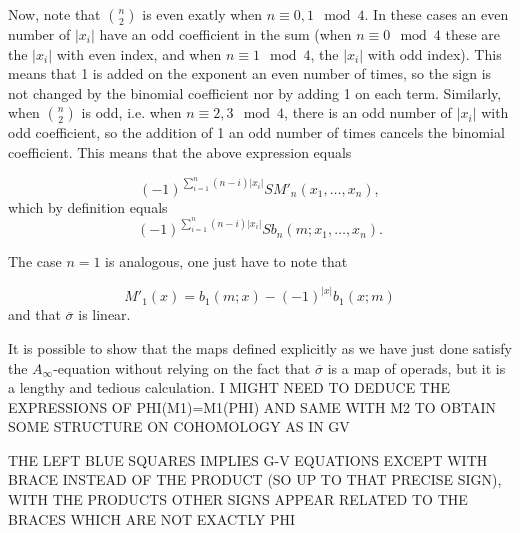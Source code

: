 \documentclass[twoside]{article}
\begin{document}
\begin{appendices}
Now, note that $\binom{n}{2}$ is even exatly when $n\equiv 0,1\mod 4$. In these cases an even number of $|x_i|$ have an odd coefficient in the sum (when $n\equiv 0\mod 4$ these are the $|x_i|$ with even index, and when $n\equiv 1\mod 4$, the $|x_i|$ with odd index). This means that 1 is added on the exponent an even number of times, so the sign is not changed by the binomial coefficient nor by adding 1 on each term. Similarly, when $\binom{n}{2}$ is odd, i.e. when $n\equiv 2,3\mod 4$, there is an odd number of $|x_i|$ with odd coefficient, so the addition of 1 an odd number of times cancels the binomial coefficient. This means that the above expression equals

\[(-1)^{\sum_{i=1}^n(n-i)|x_i|}SM'_n(x_1,\dots,x_n),\]
which by definition equals
\[(-1)^{\sum_{i=1}^n(n-i)|x_i|}Sb_n(m;x_1,\dots,x_n).\]

The case $n=1$ is analogous, one just have to note that 

\[
M'_1(x)=b_1(m;x)-(-1)^{|x|}b_1(x;m)
\]
and that $\overline{\sigma}$ is linear. 

It is possible to show that the maps defined explicitly as we have just done satisfy the $A_\infty$-equation without relying on the fact that $\overline{\sigma}$ is a map of operads, but it is a lengthy and tedious calculation.
%
I MIGHT NEED TO DEDUCE THE EXPRESSIONS OF PHI(M1)=M1(PHI) AND SAME WITH M2 TO OBTAIN SOME STRUCTURE ON COHOMOLOGY AS IN GV

THE LEFT BLUE SQUARES IMPLIES G-V EQUATIONS EXCEPT WITH BRACE INSTEAD OF THE PRODUCT (SO UP TO THAT PRECISE SIGN), WITH THE PRODUCTS OTHER SIGNS APPEAR RELATED TO THE BRACES WHICH ARE NOT EXACTLY PHI
\end{appendices}


\end{document}
